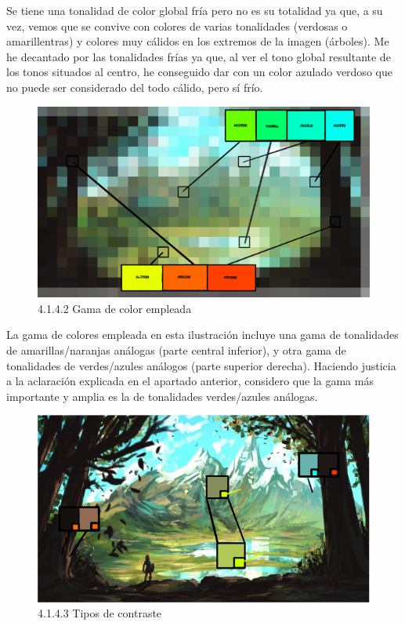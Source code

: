 \documentclass[12pt]{article}
\begin{document}
    Se tiene una tonalidad de color global fría pero no es su totalidad ya que, a su vez, vemos que se convive con colores de varias tonalidades (verdosas o amarillentras) y colores muy cálidos en los extremos de la imagen (árboles). Me he decantado por las tonalidades frías ya que, al ver el tono global resultante de los tonos situados al centro, he conseguido dar con un color azulado verdoso que no puede ser considerado del todo cálido, pero sí frío.

    \begin{figure}[H]
      \centering
      \includegraphics[width=\textwidth]{images/Nerea/Nerea Zelda concept 142.PNG}
      \caption{\small 4.1.4.2 Gama de color empleada}
    \end{figure}

    La gama de colores empleada en esta ilustración incluye una gama de tonalidades de amarillas/naranjas análogas (parte central inferior),  y otra gama de tonalidades de verdes/azules análogos (parte superior derecha). Haciendo justicia a la aclaración explicada en el apartado anterior, considero que la gama más importante y amplia es la de tonalidades verdes/azules análogas.

    \begin{figure}[H]
      \centering
      \includegraphics[width=\textwidth]{images/Nerea/Nerea Zelda concept 143.PNG}
      \caption{\small 4.1.4.3 Tipos de contraste}
    \end{figure}
\end{document}
